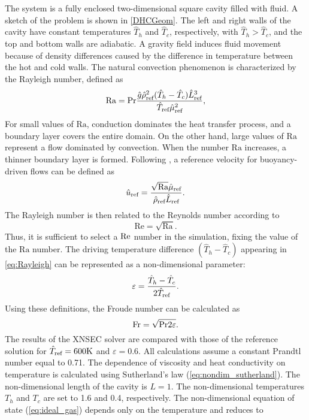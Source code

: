 The system is a fully enclosed two-dimensional square cavity filled with fluid.  A sketch of the problem is shown in \cref{DHCGeom}. The left and right walls of the cavity have constant temperatures $\hat{T}_h$ and $\hat{T}_c$, respectively, with $\hat{T}_h >\hat{T}_c$, and the top and bottom walls are adiabatic. A gravity field induces fluid movement because of density differences caused by the difference in temperature between the hot and cold walls.
The natural convection phenomenon is characterized by the Rayleigh number, defined as
\begin{equation}\label{eq:Rayleigh}
	\text{Ra} = \Prandtl \frac{\hat g \RefVal{\rho}^2(\hat T_h-\hat T_c) \RefVal{L}^3}{\RefVal{T}\RefVal{\mu}^2},
\end{equation}
For small values of $\text{Ra}$, conduction dominates the heat transfer process, and a boundary layer covers the entire domain. On the other hand, large values of $\text{Ra}$ represent a flow dominated by convection. When the number $\text{Ra}$ increases, a thinner boundary layer is formed.
Following \cite{vierendeelsBenchmarkSolutionsNatural2003}, a reference velocity for buoyancy-driven flows can be defined as
\begin{equation}
	\RefVal{u} = \frac{\sqrt{\text{Ra}} \RefVal{\mu}}{\RefVal{\rho}\RefVal{L}}.
\end{equation}
The Rayleigh number is then related to the Reynolds number according to
\begin{equation}
	\text{Re} = \sqrt{\text{Ra}}.
\end{equation}
Thus, it is sufficient to select a $\Reynolds$ number in the simulation, fixing the value of the $\text{Ra}$ number. The driving temperature difference $(\hat T_h - \hat T_c)$ appearing in \cref{eq:Rayleigh} can be represented as a non-dimensional parameter:
\begin{equation}\label{eq:nondimensionalTemperature}
	\varepsilon = \frac{\hat T_h - \hat T_c}{2\RefVal{T}}.
\end{equation}
Using these definitions, the Froude number can be calculated as
\begin{equation}
	\Froude = \sqrt{\Prandtl 2 \varepsilon}.
\end{equation}
The results of the XNSEC solver are compared with those of the reference solution for $\RefVal{T} = 600\si{K}$  and $\varepsilon = 0.6$. All calculations assume a constant Prandtl number equal to 0.71. The dependence of viscosity and heat conductivity on temperature is calculated using Sutherland's law (\cref{eq:nondim_sutherland}). The non-dimensional length of the cavity is $L=1$. The non-dimensional temperatures $T_h$ and $T_c$ are set to 1.6 and 0.4, respectively. The non-dimensional equation of state (\cref{eq:ideal_gas}) depends only on the temperature and reduces to
